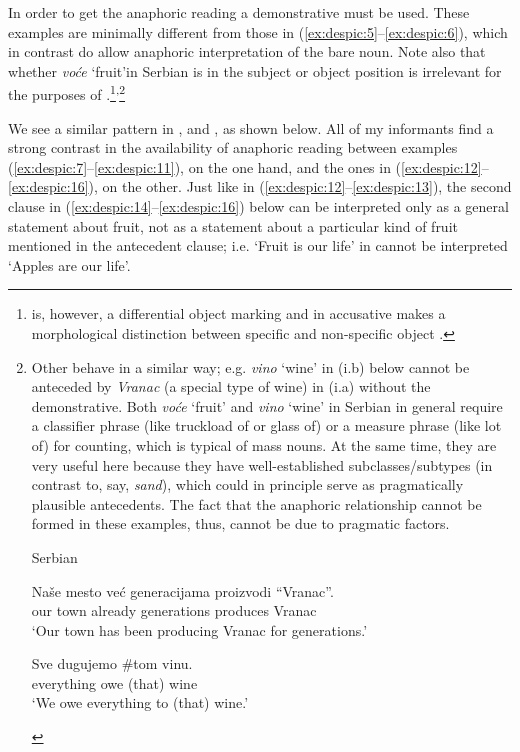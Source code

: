 \documentclass[output=paper,
modfonts
]{langscibook}
\begin{document}
	In order to get the anaphoric reading a demonstrative must be used. These examples are minimally different from those in (\ref{ex:despic:5}--\ref{ex:despic:6}), which in contrast do allow anaphoric interpretation of the bare noun. Note also that whether \textit{vo\'ce} `fruit'\linebreak\newpage\noindent in Serbian is in the subject or object position is irrelevant for the purposes of .\footnote{ is, however, a differential object marking and in accusative makes a morphological distinction between specific and non-specific object \citep[e.g.][]{Enc1991}.}\textsuperscript{,}\footnote{Other  behave in a similar way; e.g. \textit{vino} `wine' in (i.b) below cannot be anteceded by \textit{Vranac} (a special type of wine) in (i.a) without the demonstrative. Both \textit{vo\'ce} `fruit' and \textit{vino} `wine' in Serbian in general require a classifier phrase (like truckload of  or glass of) or a measure phrase (like lot of) for counting, which is typical of mass nouns. At the same time, they are very useful here because they have well-established subclasses/subtypes (in contrast to, say, \textit{sand}), which could in principle serve as pragmatically plausible antecedents. The fact that the anaphoric relationship cannot be formed in these examples, thus, cannot be due to pragmatic factors.
		
		\begin{exe} 
		 \label{ex:despic:n5}
		\textnormal{Serbian}
		\begin{xlist} 
		\ex \label{ex:despic:n5a}
		\gll 
		{Na\v se} {mesto} {ve\'c} {generacijama} {proizvodi} {``Vranac''}. \\
		our town already generations produces \phantom{``}Vranac \\
		\glt `Our town has been producing Vranac for generations.' 
		
		\ex \label{ex:despic:n5b}
		\gll 
		{Sve} {dugujemo} \textnormal{\#}{\op}tom{\cp} {vinu}. \\   
		everything owe \phantom{\#}(that) wine \\
		\glt `We owe everything to (that) wine.'
		\end{xlist}
		\end{exe} 
	}
	
	We see a similar pattern in ,  and , as shown below. All of my informants find a strong contrast in the availability of anaphoric reading between examples (\ref{ex:despic:7}--\ref{ex:despic:11}), on the one hand, and the ones in (\ref{ex:despic:12}--\ref{ex:despic:16}), on the other. Just like in (\ref{ex:despic:12}--\ref{ex:despic:13}), the second clause in (\ref{ex:despic:14}--\ref{ex:despic:16}) below can be interpreted only as a general statement about fruit, not as a statement about a particular kind of fruit mentioned in the antecedent clause; i.e. `Fruit is our life' in  cannot be interpreted `Apples are our life'.
	
\end{document}
